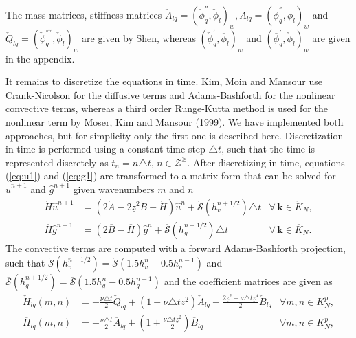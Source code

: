 \documentclass[11pt, oneside]{article}
\newcommand{\N}[1]{\check{#1}}
\newcommand{\D}[1]{\overline{#1}}
\begin{document}
The mass matrices, stiffness matrices $\N{A}_{lq} = \left( \N{\phi}_q^{''}, 
\N{\phi}_l\right)_w, 
\D{A}_{lq} = \left( \D{\phi}_q^{''}, \D{\phi}_l\right)_w 
$ and $\N{Q}_{lq} = \left(\N{\phi}^{''''}_q, \N{\phi}_l\right)_w$ are given by 
Shen, whereas $\left(\N{\phi}_q^{'}, \D{\phi}_l\right)_w$ and 
$\left(\D{\phi}_q^{'}, \N{\phi}_l\right)_w$ are given in the 
appendix.

It remains to discretize the equations in time. Kim, Moin and Mansour use 
Crank-Nicolson for the diffusive terms and Adams-Bashforth for the nonlinear 
convective terms, whereas a third order Runge-Kutta method is used for the 
nonlinear term by Moser, Kim and Mansour (1999). We have implemented both 
approaches, but for simplicity only the first one is described here. 
Discretization in time is performed using a constant time step $\triangle t$, 
such that the time is represented discretely as $t_n = n \triangle t, \, n \in 
\mathcal{Z}^{\ge}$. After 
discretizing in time, equations (\ref{eq:u1}) and (\ref{eq:g1}) are transformed 
to a matrix form that can be solved for $\hat{u}^{n+1}$ and $\hat{g}^{n+1}$ 
given wavenumbers $m$ and $n$
\begin{align}
\N{H}\hat{u}^{n+1} & = \left(2\N{A} - 2\underline{z}^2\N{B} - \N{H} 
\right)\hat{u}^{n} + \N{\mathcal{S}}(h_v^{n+1/2}) \triangle t & 
\forall \, {\bm{k}} \in \N{K}_N, 
\label{eq:ufin}\\ 
\D{H} \hat{g}^{n+1} &= \left(2 \D{B}-\D{H}\right) 
\hat{g}^{n} + \D{\mathcal{S}}(h_g^{n+1/2}) \triangle t &\forall \, 
{\bm{k}} \in 
\D{K}_N. \label{eq:gfin}
\end{align}
The convective terms are computed with 
a forward Adams-Bashforth projection, such that $\N{\mathcal{S}}(h_v^{n+1/2}) = 
\N{\mathcal{S}}(1.5h_v^{n} - 0.5 h_v^{n-1})$ and $\D{\mathcal{S}}(h_g^{n+1/2}) 
= \D{\mathcal{S}}(1.5h_g^{n} - 0.5 h_g^{n-1})$ and the coefficient matrices are 
given as
\begin{align}
\N{H}_{lq}(m, n) &= -\frac{\nu \triangle t}{2}\N{Q}_{lq} + \left( 1 + \nu 
\triangle t 
\underline{z}^2 \right) \N{A}_{lq} - \frac{2\underline{z}^2 + \nu \triangle t 
\underline{z}^4}{2} \N{B}_{lq} &\forall m, n \in K_N^p, \\
\D{H}_{lq}(m, n) &= -\frac{\nu \triangle 
t}{2}\D{A}_{lq} + (1 + \frac{\nu \triangle t \underline{z}^2}{2}) \D{B}_{lq} 
&\forall m, n \in K_N^p,
\end{align}
\end{document}
